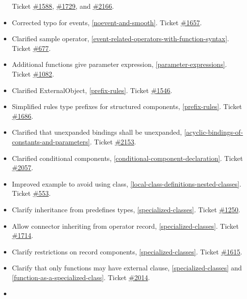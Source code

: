 \begin{itemize}
  Ticket \href{https://trac.modelica.org/Modelica/ticket/1588}{\#1588},
  \href{https://trac.modelica.org/Modelica/ticket/1729}{\#1729}, and
  \href{https://trac.modelica.org/Modelica/ticket/2166}{\#2166}.
\item
  Corrected typo for events, \ref{noevent-and-smooth}. Ticket
  \href{https://trac.modelica.org/Modelica/ticket/1657}{\#1657}.
\item
  Clarified sample operator, \ref{event-related-operators-with-function-syntax}. Ticket
  \href{https://trac.modelica.org/Modelica/ticket/677}{\#677}.
\item
  Additional functions give parameter expression, \ref{parameter-expressions}. Ticket
  \href{https://trac.modelica.org/Modelica/ticket/1082}{\#1082}.
\item
  Clarified ExternalObject, \ref{prefix-rules}. Ticket
  \href{https://trac.modelica.org/Modelica/ticket/1546}{\#1546}.
\item
  Simplified rules type prefixes for structured components, \ref{prefix-rules}. Ticket
  \href{https://trac.modelica.org/Modelica/ticket/1686}{\#1686}.
\item
  Clarified that unexpanded bindings shall be unexpanded, \ref{acyclic-bindings-of-constants-and-parameters}.
  Ticket \href{https://trac.modelica.org/Modelica/ticket/2153}{\#2153}.
\item
  Clarified conditional components, \ref{conditional-component-declaration}. Ticket
  \href{https://trac.modelica.org/Modelica/ticket/2057}{\#2057}.
\item
  Improved example to avoid using class, \ref{local-class-definitions-nested-classes}. Ticket
  \href{https://trac.modelica.org/Modelica/ticket/553}{\#553}.
\item
  Clarify inheritance from predefines types, \ref{specialized-classes}. Ticket
  \href{https://trac.modelica.org/Modelica/ticket/1250}{\#1250}.
\item
  Allow connector inheriting from operator record, \ref{specialized-classes}. Ticket
  \href{https://trac.modelica.org/Modelica/ticket/1714}{\#1714}.
\item
  Clarify restrictions on record components, \ref{specialized-classes}. Ticket
  \href{https://trac.modelica.org/Modelica/ticket/1615}{\#1615}.
\item
  Clarify that only functions may have external clause, \ref{specialized-classes} and
  \ref{function-as-a-specialized-class}. Ticket
  \href{https://trac.modelica.org/Modelica/ticket/2014}{\#2014}.
\item

\end{itemize}
